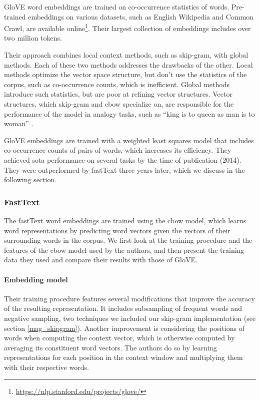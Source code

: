 GloVE word embeddings \cite{pennington2014glove} are trained on co-occurrence statistics of words. Pre-trained embeddings on various datasets, such as English Wikipedia and Common Crawl, are available online\footnote{\url{https://nlp.stanford.edu/projects/glove/}}. Their largest collection of embeddings includes over two million tokens.

Their approach combines local context methods, such as skip-gram, with global methods. Each of these two methods addresses the drawbacks of the other. Local methods optimize the vector space structure, but don't use the statistics of the corpus, such as co-occurrence counts, which is inefficient. Global methods introduce such statistics, but are poor at refining vector structures. Vector structures, which skip-gram and \acrshort{cbow} specialize on, are responsible for the performance of the model in analogy tasks, such as ``king is to queen as man is to woman'' \cite{pennington2014glove}.

GloVE embeddings are trained with a weighted least squares model that includes co-occurrence counts of pairs of words, which increases its efficiency. They achieved \acrshort{sota} performance on several tasks by the time of publication (2014). They were outperformed by fastText three years later, which we discuss in the following section.

\subsubsection{FastText}

The fastText word embeddings \cite{mikolov2017advances} are trained using the \acrfull{cbow} model, which learns word representations by predicting word vectors given the vectors of their surrounding words in the corpus. We first look at the training procedure and the features of the \acrshort{cbow} model used by the authors, and then present the training data they used and compare their results with those of GloVE.

\paragraph{Embedding model} \mbox{}

Their training procedure features several modifications that improve the accuracy of the resulting representation. It includes subsampling of frequent words and negative sampling, two techniques we included our skip-gram implementation (see section \ref{mag_skipgram}). Another improvement is considering the positions of words when computing the context vector, which is otherwise computed by averaging its constituent word vectors. The authors do so by learning representations for each position in the context window and multiplying them with their respective words.

